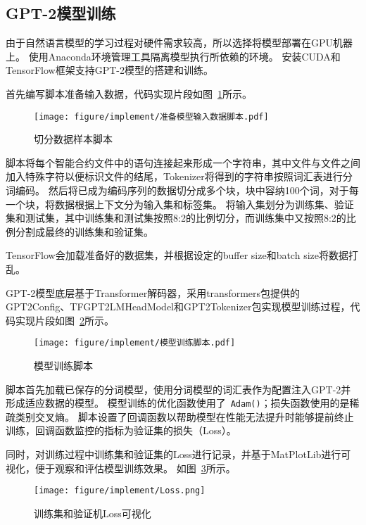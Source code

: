 \subsection{GPT-2模型训练}

由于自然语言模型的学习过程对硬件需求较高，所以选择将模型部署在GPU机器上。
使用Anaconda环境管理工具隔离模型执行所依赖的环境。
安装CUDA和TensorFlow框架支持GPT-2模型的搭建和训练。

首先编写脚本准备输入数据，代码实现片段如图~\ref{fig:5.8}所示。

\begin{figure}[htb]
  \centering
  \texttt{[image: figure/implement/准备模型输入数据脚本.pdf]}
  \caption{切分数据样本脚本}\label{fig:5.8}
\end{figure}

脚本将每个智能合约文件中的语句连接起来形成一个字符串，其中文件与文件之间加入特殊字符以便标识文件的结尾，Tokenizer将得到的字符串按照词汇表进行分词编码。
然后将已成为编码序列的数据切分成多个块，块中容纳100个词，对于每一个块，将数据根据上下文分为输入集和标签集。
将输入集划分为训练集、验证集和测试集，其中训练集和测试集按照8:2的比例切分，而训练集中又按照8:2的比例分割成最终的训练集和验证集。

TensorFlow会加载准备好的数据集，并根据设定的buffer size和batch size将数据打乱。

GPT-2模型底层基于Transformer解码器，采用transformers包提供的GPT2Config、TFGPT2LMHeadModel和GPT2Tokenizer包实现模型训练过程，代码实现片段如图~\ref{fig:5.9}所示。

\begin{figure}[htb]
  \centering
  \texttt{[image: figure/implement/模型训练脚本.pdf]}
  \caption{模型训练脚本}\label{fig:5.9}
\end{figure}

脚本首先加载已保存的分词模型，使用分词模型的词汇表作为配置注入GPT-2并形成适应数据的模型。
模型训练的优化函数使用了~\texttt{Adam()}；损失函数使用的是稀疏类别交叉熵。
脚本设置了回调函数以帮助模型在性能无法提升时能够提前终止训练，回调函数监控的指标为验证集的损失（Loss）。

同时，对训练过程中训练集和验证集的Loss进行记录，并基于MatPlotLib进行可视化，便于观察和评估模型训练效果。
如图~\ref{fig:5.10}所示。

\begin{figure}[htb]
  \centering
  \texttt{[image: figure/implement/Loss.png]}
  \caption{训练集和验证机Loss可视化}\label{fig:5.10}
\end{figure}

